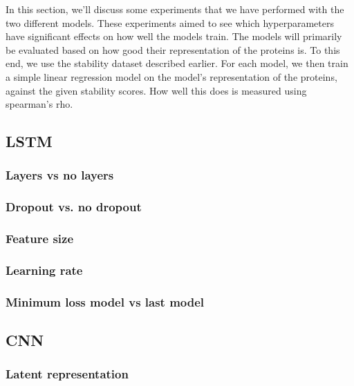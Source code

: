 In this section, we'll discuss some experiments that we have performed with the two different models. These experiments aimed to see which hyperparameters have significant effects on how well the models train. The models will primarily be evaluated based on how good their representation of the proteins is. To this end, we use the stability dataset described earlier. For each model, we then train a simple linear regression model on the model's representation of the proteins, against the given stability scores. How well this does is measured using spearman's rho.
\subsection{LSTM}  %
%

\subsubsection{Layers vs no layers} %


\subsubsection{Dropout vs. no dropout} %


\subsubsection{Feature size} %


\subsubsection{Learning rate} %


\subsubsection{Minimum loss model vs last model} %


\subsection{CNN} %
\subsubsection{Latent representation} %

